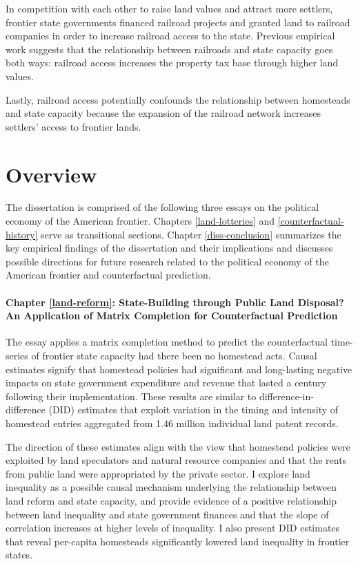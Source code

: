 In competition with each other to raise land values and attract more settlers, frontier state governments financed railroad projects and granted land to railroad companies in order to increase railroad access to the state. Previous empirical work suggests that the relationship between railroads and state capacity goes both ways: railroad access increases the property tax base through higher land values. 

Lastly, railroad access potentially confounds the relationship between homesteads and state capacity because the expansion of the railroad network increases settlers' access to frontier lands. 

\section{Overview}

The dissertation is comprised of the following three essays on the political economy of the American frontier. Chapters \ref{land-lotteries} and \ref{counterfactual-history} serve as transitional sections. Chapter \ref{diss-conclusion} summarizes the key empirical findings of the dissertation and their implications and discusses possible directions for future research related to the political economy of the American frontier and counterfactual prediction.

\paragraph{Chapter \ref{land-reform}: State-Building through Public Land Disposal? An Application of Matrix Completion for Counterfactual Prediction}
The essay applies a matrix completion method to predict the counterfactual time-series of frontier state capacity had there been no homestead acts. Causal estimates signify that homestead policies had significant and long-lasting negative impacts on state government expenditure and revenue that lasted a century following their implementation. These results are similar to difference-in-difference (DID) estimates that exploit variation in the timing and intensity of homestead entries aggregated from 1.46 million individual land patent records.

The direction of these estimates align with the view that homestead policies were exploited by land speculators and natural resource companies and that the rents from public land were appropriated by the private sector. I explore land inequality as a possible causal mechanism underlying the relationship between land reform and state capacity, and provide evidence of a positive relationship between land inequality and state government finances and that the slope of correlation increases at higher levels of inequality. I also present DID estimates that reveal per-capita homesteads significantly lowered land inequality in frontier states.

